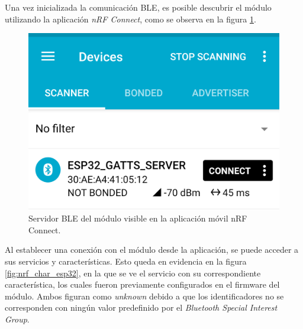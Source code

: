 Una vez inicializada la comunicación BLE, es posible descubrir el módulo utilizando la aplicación \emph{nRF Connect}, como se observa en la figura \ref{fig:nrf_discover_esp32}.

\begin{figure}[h]
\centering
\includegraphics[scale=0.16]{./Figures/nrf_discover_esp32.png}
\caption{Servidor BLE del módulo visible en la aplicación móvil nRF Connect.}
\label{fig:nrf_discover_esp32}
\end{figure}

Al establecer una conexión con el módulo desde la aplicación, se puede acceder a sus servicios y características. Esto queda en evidencia en la figura \ref{fig:nrf_char_esp32}, en la que se ve el servicio con su correspondiente característica, los cuales fueron previamente configurados en el firmware del módulo. Ambos figuran como \emph{unknown} debido a que los identificadores no se corresponden con ningún valor predefinido por el \emph{Bluetooth Special Interest Group}.

